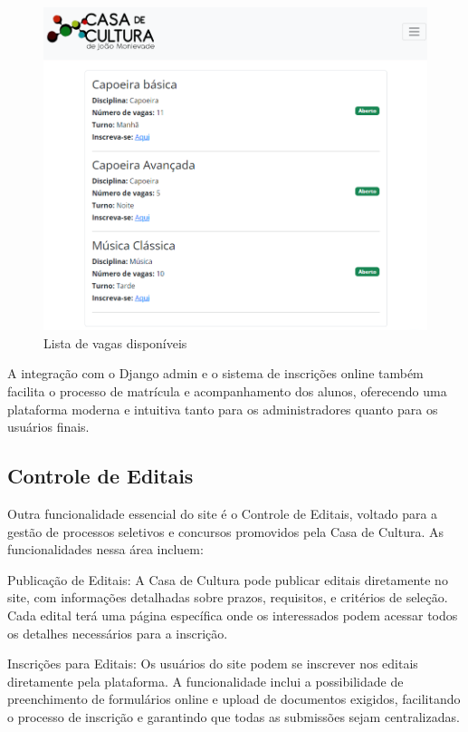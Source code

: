 \begin{figure}[htb]
	\caption{\label{fig_grafico}Lista de vagas disponíveis}
	\begin{center}
	    \includegraphics[scale=0.5]{./img/lista_turmas.png}
	\end{center}
\end{figure}

A integração com o Django admin e o sistema de inscrições online também facilita o processo de matrícula e acompanhamento dos alunos, oferecendo uma plataforma moderna e intuitiva tanto para os administradores quanto para os usuários finais.

\subsection{Controle de Editais}

Outra funcionalidade essencial do site é o Controle de Editais, voltado para a gestão de processos seletivos e concursos promovidos pela Casa de Cultura. As funcionalidades nessa área incluem:

Publicação de Editais: A Casa de Cultura pode publicar editais diretamente no site, com informações detalhadas sobre prazos, requisitos, e critérios de seleção. Cada edital terá uma página específica onde os interessados podem acessar todos os detalhes necessários para a inscrição.

Inscrições para Editais: Os usuários do site podem se inscrever nos editais diretamente pela plataforma. A funcionalidade inclui a possibilidade de preenchimento de formulários online e upload de documentos exigidos, facilitando o processo de inscrição e garantindo que todas as submissões sejam centralizadas.

